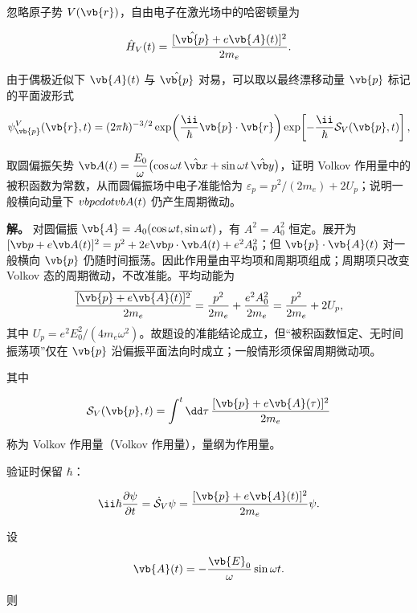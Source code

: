 忽略原子势 \(V(\vb{r})\)，自由电子在激光场中的哈密顿量为

\[
\hat H_V(t)=\frac{[\hat{\vb{p}}+e\vb{A}(t)]^2}{2m_e}.
\]

由于偶极近似下 \(\vb{A}(t)\) 与 \(\hat{\vb{p}}\) 对易，可以取以最终漂移动量 \(\vb{p}\) 标记的平面波形式

\begin{equation}
\psi_{\vb{p}}^{V}(\vb{r},t)
=(2\pi\hbar)^{-3/2}
\exp\!\left(\frac{\ii}{\hbar}\vb{p}\cdot\vb{r}\right)
\exp\!\left[-\frac{\ii}{\hbar}\mathcal S_V(\vb{p},t)\right],
\label{eq:volkov-action}
\end{equation}


\par
\begin{workedexample}
取圆偏振矢势 $\vb A(t)=\dfrac{E_0}{\omega}\bigl(\cos\omega t\,\hat{\vb x}+\sin\omega t\,\hat{\vb y}\bigr)$，证明 Volkov 作用量中的被积函数为常数，从而圆偏振场中电子准能恰为 $\varepsilon_p=p^2/(2m_e)+2U_p$；说明一般横向动量下 \(\\vb{p}\\cdot\\vb{A}(t)\) 仍产生周期微动。

\textbf{解。} 对圆偏振 \(\vb{A}=A_0(\cos\omega t,\sin\omega t)\)，有 \(A^2=A_0^2\) 恒定。展开为 \([\vb p+e\vb A(t)]^2=p^2+2e\vb p\cdot\vb A(t)+e^2A_0^2\)；但 \(\vb{p}\cdot\vb{A}(t)\) 对一般横向 \(\vb{p}\) 仍随时间振荡。因此作用量由平均项和周期项组成；周期项只改变 Volkov 态的周期微动，不改准能。平均动能为
\[
\overline{\frac{[\vb{p}+e\vb{A}(t)]^2}{2m_e}}=\frac{p^2}{2m_e}+\frac{e^2A_0^2}{2m_e}=\frac{p^2}{2m_e}+2U_p,
\]
其中 \(U_p=e^2E_0^2/(4m_e\omega^2)\)。故题设的准能结论成立，但“被积函数恒定、无时间振荡项”仅在 \(\vb{p}\) 沿偏振平面法向时成立；一般情形须保留周期微动项。
\end{workedexample}
\par
其中

\[
\mathcal S_V(\vb{p},t)
=
\int^t\dd\tau\,
\frac{[\vb{p}+e\vb{A}(\tau)]^2}{2m_e}
\]

称为 Volkov 作用量（Volkov 作用量），量纲为作用量。

验证时保留 \(\hbar\)：

\[
\ii\hbar\frac{\partial\psi}{\partial t}
=\dot{\mathcal S}_V\psi
=\frac{[\vb{p}+e\vb{A}(t)]^2}{2m_e}\psi.
\]

设

\[
\vb{A}(t)=-\frac{\vb{E}_0}{\omega}\sin\omega t.
\]

则

